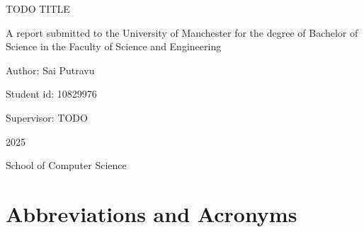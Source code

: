 \documentclass[10pt,oneside]{report}
\begin{document}
\begin{titlepage}
    \centering
    {\LARGE TODO TITLE\\\par}
    \vspace{2cm}
    {\large A report submitted to the University of Manchester for the degree of
    Bachelor of Science in the Faculty of Science and Engineering\par}
    \vspace{2cm}
    \vspace{1cm}

    {\large Author: Sai Putravu\par}
    {\large Student id: 10829976\par}
    {\large Supervisor: TODO\par}
    \vfill
    {\large 2025\par}
    \vspace{1cm}
    {\large School of Computer Science\par}
\end{titlepage}


\tableofcontents
\clearpage

\listoffigures
\clearpage

\listoftables
\clearpage


{}
\chapter*{Abbreviations and Acronyms}

\begin{table}[ht]
    \centering
    \begin{tabular}{ll}
    \end{tabular}
\end{table}
\end{document}

